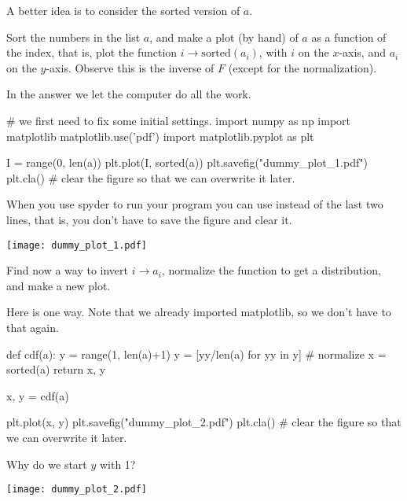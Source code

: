 \documentclass{scrartcl}
\begin{document}
A better idea is to consider the sorted version of $a$. 

\begin{exercise}
  Sort the numbers in the list $a$, and make a plot (by hand) of $a$ as a function of the index, that is, plot the function $i\to \text{sorted}(a_i)$, with $i$ on the $x$-axis, and $a_i$ on the $y$-axis.  Observe this is the inverse of $F$ (except for the normalization).
  \begin{solution}
    In the answer we let the computer do all the work.  

\begin{pyblock}
# we first need to fix some initial settings.
import numpy as np
import matplotlib
matplotlib.use('pdf') 
import matplotlib.pyplot as plt

I = range(0, len(a))
plt.plot(I, sorted(a))
plt.savefig("dummy_plot_1.pdf")
plt.cla() # clear the figure so that we can overwrite it later.
\end{pyblock}

When you use spyder to run your program you can use  instead of the last two lines, that is, you don't have to save the figure and clear it. 

\begin{center}
\texttt{[image: dummy\_plot\_1.pdf]}
\end{center}
  \end{solution}
\end{exercise}

\begin{exercise}
  Find now a way to invert $i\to a_i$, normalize the function to get a distribution, and make a new plot. 
  \begin{solution}
Here is one way. Note that we already imported matplotlib, so we don't have to that again.
\begin{pyblock}
def cdf(a):  
    y = range(1, len(a)+1)
    y = [yy/len(a) for yy in y] # normalize
    x = sorted(a)
    return x, y

x, y = cdf(a)

plt.plot(x, y)
plt.savefig("dummy_plot_2.pdf")
plt.cla() # clear the figure so that we can overwrite it later.
\end{pyblock}
Why do we start $y$ with 1?


\begin{center}
\texttt{[image: dummy\_plot\_2.pdf]}
\end{center}
  \end{solution}
\end{exercise}
\end{document}
